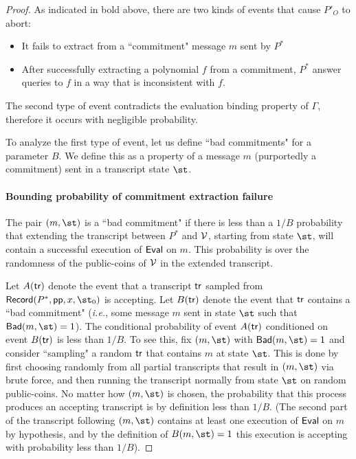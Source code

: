 \begin{proof}
As indicated in bold above, there are two kinds of events that cause $P'_O$ to abort: 
\begin{itemize}
\item It fails to extract from a ``commitment" message $m$ sent by $P^*$
\item After successfully extracting a polynomial $f$ from a commitment, $P^*$ answer queries to $f$ in a way that is inconsistent with $f$. 
\end{itemize}

The second type of event contradicts the evaluation binding property of $\Gamma$, therefore it occurs with negligible probability. 

To analyze the first type of event, let us define ``bad commitments" for a parameter $B$. We define this as a property of a message $m$ (purportedly a commitment) sent in a transcript state $\st$.

\paragraph{Bounding probability of commitment extraction failure} 
The pair $(m, \st)$ is a ``bad commitment" if there is less than a $1/B$ probability that extending the transcript between $P^*$ and $\mathcal{V}$, starting from state $\st$, will contain a successful execution of $\textsf{{Eval}}$ on $m$. This probability is over the randomness of the public-coins of $\mathcal{V}$ in the extended transcript. %

Let $A(\textsf{{tr}})$ denote the event that a transcript $\textsf{{tr}}$ sampled from $\pro{Record}(P^*, \params, x, \st_0)$ is accepting. Let $B(\textsf{{tr}})$ denote the event that $\textsf{{tr}}$ contains a ``bad commitment" (\emph{i.e.}, some message $m$ sent in state $\st$ such that $\pro{Bad}(m, \st) = 1$). The conditional probability of event $A(\textsf{{tr}})$ conditioned on event $B(\textsf{{tr}})$ is less than $1/B$. To see this, fix $(m, \st)$ with $\pro{Bad}(m, \st) = 1$ and consider ``sampling" a random $\textsf{{tr}}$ that contains $m$ at state $\st$. This is done by first choosing randomly from all partial transcripts that result in $(m, \st)$ via brute force, and then running the transcript normally from state $\st$ on random public-coins. No matter how $(m, \st)$ is chosen, the probability that this process produces an accepting transcript is by definition less than $1/B$. (The second part of the transcript following $(m, \st)$ contains at least one execution of $\textsf{{Eval}}$ on $m$ by hypothesis, and by the definition of $B(m, \st) = 1$ this execution is accepting with probability less than $1/B$).


\end{proof}
